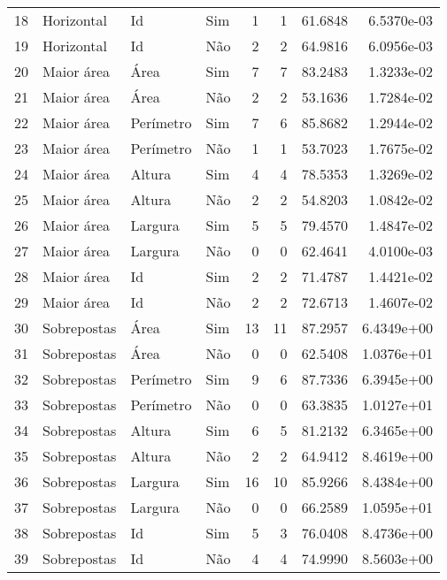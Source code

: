 \begin{tabular}{rlllrrrr}
    18 & Horizontal  & Id        & Sim     & 1        & 1       & 61.6848      & 6.5370e-03 \\
    19 & Horizontal  & Id        & Não     & 2        & 2       & 64.9816      & 6.0956e-03 \\
    20 & Maior área  & Área      & Sim     & 7        & 7       & 83.2483      & 1.3233e-02 \\
    21 & Maior área  & Área      & Não     & 2        & 2       & 53.1636      & 1.7284e-02 \\
    22 & Maior área  & Perímetro & Sim     & 7        & 6       & 85.8682      & 1.2944e-02 \\
    23 & Maior área  & Perímetro & Não     & 1        & 1       & 53.7023      & 1.7675e-02 \\
    24 & Maior área  & Altura    & Sim     & 4        & 4       & 78.5353      & 1.3269e-02 \\
    25 & Maior área  & Altura    & Não     & 2        & 2       & 54.8203      & 1.0842e-02 \\
    26 & Maior área  & Largura   & Sim     & 5        & 5       & 79.4570      & 1.4847e-02 \\
    27 & Maior área  & Largura   & Não     & 0        & 0       & 62.4641      & 4.0100e-03 \\
    28 & Maior área  & Id        & Sim     & 2        & 2       & 71.4787      & 1.4421e-02 \\
    29 & Maior área  & Id        & Não     & 2        & 2       & 72.6713      & 1.4607e-02 \\
    30 & Sobrepostas & Área      & Sim     & 13       & 11      & 87.2957      & 6.4349e+00 \\
    31 & Sobrepostas & Área      & Não     & 0        & 0       & 62.5408      & 1.0376e+01 \\
    32 & Sobrepostas & Perímetro & Sim     & 9        & 6       & 87.7336      & 6.3945e+00 \\
    33 & Sobrepostas & Perímetro & Não     & 0        & 0       & 63.3835      & 1.0127e+01 \\
    34 & Sobrepostas & Altura    & Sim     & 6        & 5       & 81.2132      & 6.3465e+00 \\
    35 & Sobrepostas & Altura    & Não     & 2        & 2       & 64.9412      & 8.4619e+00 \\
    36 & Sobrepostas & Largura   & Sim     & 16       & 10      & 85.9266      & 8.4384e+00 \\
    37 & Sobrepostas & Largura   & Não     & 0        & 0       & 66.2589      & 1.0595e+01 \\
    38 & Sobrepostas & Id        & Sim     & 5        & 3       & 76.0408      & 8.4736e+00 \\
    39 & Sobrepostas & Id        & Não     & 4        & 4       & 74.9990      & 8.5603e+00 \\
    \hline
\end{tabular}